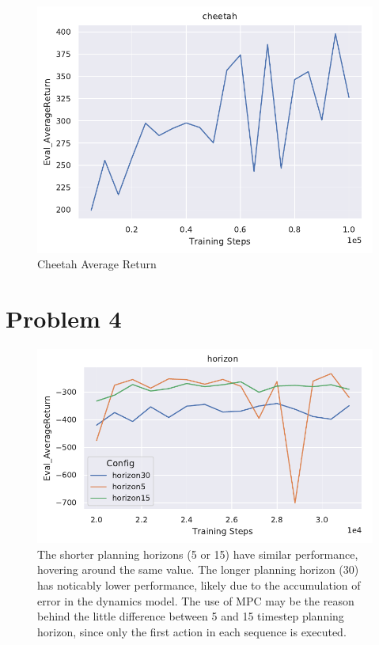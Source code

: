 \documentclass[letterpaper, 10pt]{article}
\begin{document}
\begin{figure}[h]
\begin{minipage}{0.32\textwidth}
        \centering
        \includegraphics[width=\textwidth]{q3_cheetah.pdf}
        \caption{Cheetah Average Return}
    \end{minipage}
\end{figure}

\section*{Problem 4}
\begin{figure}[h]
	\centering
	\includegraphics{q4_horizon.pdf}
	\caption{The shorter planning horizons (5 or 15) have similar performance, hovering around the same value. 
			The longer planning horizon (30) has noticably lower performance, likely due to the accumulation
			of error in the dynamics model. The use of MPC may be the reason behind the little difference 
			between 5 and 15 timestep planning horizon, since only the first action in each sequence is
			executed.}
\end{figure}
\end{document}
